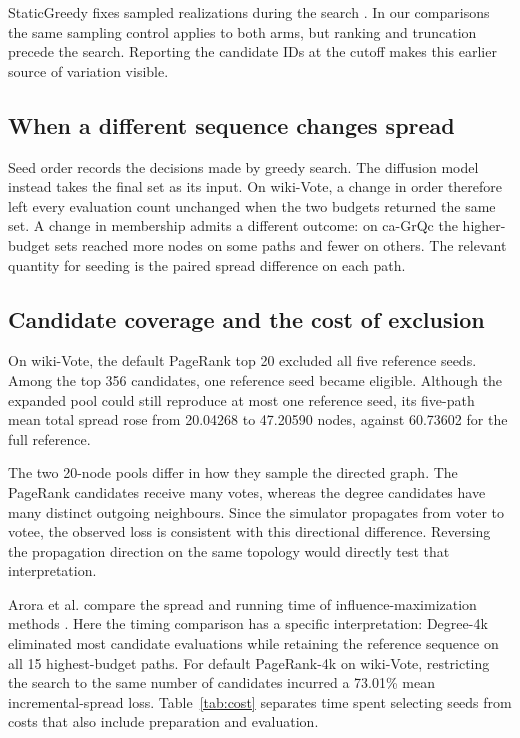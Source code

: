 \documentclass[smallextended]{svjour3}
\begin{document}
StaticGreedy fixes sampled realizations during the search \cite{ref8}. In our comparisons the same sampling control applies to both arms, but ranking and truncation precede the search. Reporting the candidate IDs at the cutoff makes this earlier source of variation visible.

\subsection{When a different sequence changes spread}
Seed order records the decisions made by greedy search. The diffusion model instead takes the final set as its input. On wiki-Vote, a change in order therefore left every evaluation count unchanged when the two budgets returned the same set. A change in membership admits a different outcome: on ca-GrQc the higher-budget sets reached more nodes on some paths and fewer on others. The relevant quantity for seeding is the paired spread difference on each path.

\subsection{Candidate coverage and the cost of exclusion}
On wiki-Vote, the default PageRank top 20 excluded all five reference seeds. Among the top 356 candidates, one reference seed became eligible. Although the expanded pool could still reproduce at most one reference seed, its five-path mean total spread rose from 20.04268 to 47.20590 nodes, against 60.73602 for the full reference.

The two 20-node pools differ in how they sample the directed graph. The PageRank candidates receive many votes, whereas the degree candidates have many distinct outgoing neighbours. Since the simulator propagates from voter to votee, the observed loss is consistent with this directional difference. Reversing the propagation direction on the same topology would directly test that interpretation.

Arora et al. compare the spread and running time of influence-maximization methods \cite{ref16}. Here the timing comparison has a specific interpretation: Degree-4k eliminated most candidate evaluations while retaining the reference sequence on all 15 highest-budget paths. For default PageRank-4k on wiki-Vote, restricting the search to the same number of candidates incurred a 73.01\% mean incremental-spread loss. Table~\ref{tab:cost} separates time spent selecting seeds from costs that also include preparation and evaluation.
\end{document}

